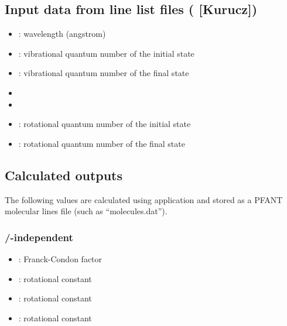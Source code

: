 \documentclass[letterpaper,10pt,english]{sphinxmanual}
\begin{document}
\subsection{Input data from line list files ( {[}Kurucz{]})}
\label{\detokenize{convmol:input-data-from-line-list-files-e-g-kurucz}}\begin{itemize}
\item {} 
: wavelength (angstrom)

\item {} 
: vibrational quantum number of the initial state

\item {} 
: vibrational quantum number of the final state

\item {} 

\item {} 

\item {} 
: rotational quantum number of the initial state

\item {} 
: rotational quantum number of the final state

\end{itemize}


\subsection{Calculated outputs}
\label{\detokenize{convmol:calculated-outputs}}
The following values are calculated using application  and stored as a PFANT molecular lines file (such as “molecules.dat”).


\subsubsection{/-independent}
\label{\detokenize{convmol:jl-j2l-independent}}\begin{itemize}
\item {} 
: Franck-Condon factor

\item {} 
: rotational constant

\item {} 
: rotational constant

\item {} 
: rotational constant

\end{itemize}
\end{document}
